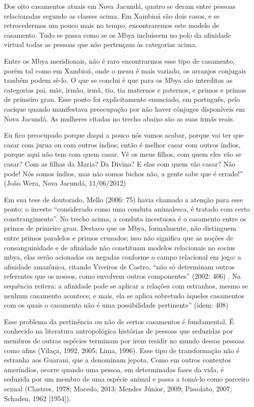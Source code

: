 Dos oito casamentos atuais em Nova Jacundá, quatro se deram entre
pessoas relacionadas segundo as classes acima. Em Xambioá são dois
casos, e se retrocedermos um pouco mais no tempo, encontraremos este
modelo de casamento. Tudo se passa como se os Mbya incluíssem no polo da
afinidade virtual todas as pessoas que não pertençam às categorias
acima.

Entre os Mbya meridionais, não é raro encontrarmos esse tipo de
casamento, porém tal como em Xambioá, onde o menu é mais variado, os
arranjos conjugais também podem sê-lo. O que se conclui é que para os
Mbya são interditas as categorias pai, mãe, irmão, irmã, tio, tia
maternos e paternos, e primos e primas de primeiro grau. Esse ponto foi
explicitamente enunciado, em português, pelo cacique quando manifestava
preocupação por não haver cônjuges disponíveis em Nova Jacundá. As
mulheres citadas no trecho abaixo são as suas irmãs reais.

Eu fico preocupado porque daqui a pouco nós vamos acabar, porque vai ter
que casar com jurua ou com outros índios; então é melhor casar com
outros índios, porque aqui não tem com quem casar. Vê os meus filhos,
com quem eles vão se casar? Com as filhas da Maria? Da Divina? E elas
com quem vão casar? Não pode! Nós somos índios, mas não somos bichos
não, a gente sabe que é errado!'' (João Wera, Nova Jacundá, 11/06/2012)

Em sua tese de doutorado, Mello (2006: 75) havia chamado a atenção para
esse ponto: o incesto ``considerado como uma conduta animalesca, é
tratado com certo constrangimento''. No trecho acima, a conduta
incestuosa é o casamento entre os primos de primeiro grau. Destaco que
os Mbya, formalmente, não distinguem entre primos paralelos e primos
cruzados; isso não significa que as noções de consanguinidade e de
afinidade não constituam modelos relacionais no socius mbya, elas serão
acionadas ou negadas conforme o campo relacional em jogo: a afinidade
amazônica, citando Viveiros de Castro, ``não só determinam outros
referentes que os nossos, como envolvem outros componentes'' (2002: 406)
. Na sequência reitera: a afinidade pode se aplicar a relações com
estranhos, mesmo se nenhum casamento acontece; e mais, ela se aplica
sobretudo àqueles casamentos com os quais o casamento não é uma
possibilidade pertinente'' (idem: 408)

Esse problema da pertinência ou não de certos casamentos é fundamental.
É conhecido na literatura antropológica histórias de pessoas que
seduzidas por membros de outras espécies terminam por irem residir no
mundo dessas pessoas como afins (Vilaça, 1992, 2005; Lima, 1996). Esse
tipo de transformação não é estranha aos Guarani, que a denominam
jepota. Como em outros contextos ameríndios, ocorre quando uma pessoa,
em determinadas fases da vida, é seduzida por um membro de uma espécie
animal e passa a tomá-lo como parceiro sexual (Clastres, 1978; Macedo,
2013; Mendes Júnior, 2009; Pissolato, 2007; Schaden, 1962 {[}1954{]}).

